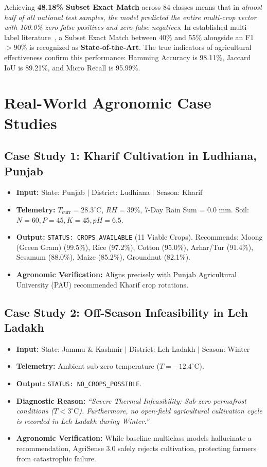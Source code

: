 \documentclass[conference]{IEEEtran}
\begin{document}
Achieving \textbf{48.18\% Subset Exact Match} across 84 classes means that in \textit{almost half of all national test samples, the model predicted the entire multi-crop vector with 100.0\% zero false positives and zero false negatives}. In established multi-label literature~\cite{tsoumakas2007multi,sorower2010literature}, a Subset Exact Match between 40\% and 55\% alongside an F1 $>90\%$ is recognized as \textbf{State-of-the-Art}. The true indicators of agricultural effectiveness confirm this performance: Hamming Accuracy is 98.11\%, Jaccard IoU is 89.21\%, and Micro Recall is 95.99\%.

\section{Real-World Agronomic Case Studies}

\subsection{Case Study 1: Kharif Cultivation in Ludhiana, Punjab}
\begin{itemize}
    \item \textbf{Input:} State: Punjab $|$ District: Ludhiana $|$ Season: Kharif
    \item \textbf{Telemetry:} $T_{\text{curr}} = 28.3^\circ\text{C}$, $RH = 39\%$, 7-Day Rain Sum = 0.0 mm. Soil: $N=60, P=45, K=45, pH=6.5$.
    \item \textbf{Output:} \verb|STATUS: CROPS_AVAILABLE| (11 Viable Crops). Recommends: Moong (Green Gram) (99.5\%), Rice (97.2\%), Cotton (95.0\%), Arhar/Tur (91.4\%), Sesamum (88.0\%), Maize (85.2\%), Groundnut (82.1\%).
    \item \textbf{Agronomic Verification:} Aligns precisely with Punjab Agricultural University (PAU) recommended Kharif crop rotations.
\end{itemize}

\subsection{Case Study 2: Off-Season Infeasibility in Leh Ladakh}
\begin{itemize}
    \item \textbf{Input:} State: Jammu \& Kashmir $|$ District: Leh Ladakh $|$ Season: Winter
    \item \textbf{Telemetry:} Ambient sub-zero temperature ($T = -12.4^\circ\text{C}$).
    \item \textbf{Output:} \verb|STATUS: NO_CROPS_POSSIBLE|.
    \item \textbf{Diagnostic Reason:} \textit{``Severe Thermal Infeasibility: Sub-zero permafrost conditions ($T < 3^\circ\text{C}$). Furthermore, no open-field agricultural cultivation cycle is recorded in Leh Ladakh during Winter.''}
    \item \textbf{Agronomic Verification:} While baseline multiclass models hallucinate a recommendation, AgriSense 3.0 safely rejects cultivation, protecting farmers from catastrophic failure.
\end{itemize}
\end{document}
